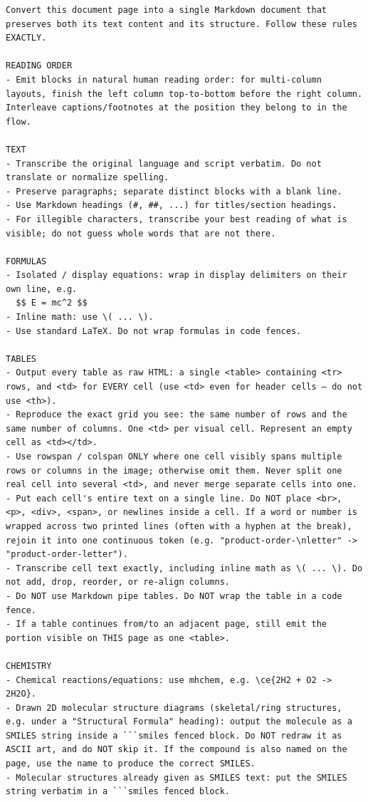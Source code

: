 \documentclass[11pt]{article}
\begin{document}
\begin{lstlisting}[style=prompt]
Convert this document page into a single Markdown document that preserves both its text content and its structure. Follow these rules EXACTLY.

READING ORDER
- Emit blocks in natural human reading order: for multi-column layouts, finish the left column top-to-bottom before the right column. Interleave captions/footnotes at the position they belong to in the flow.

TEXT
- Transcribe the original language and script verbatim. Do not translate or normalize spelling.
- Preserve paragraphs; separate distinct blocks with a blank line.
- Use Markdown headings (#, ##, ...) for titles/section headings.
- For illegible characters, transcribe your best reading of what is visible; do not guess whole words that are not there.

FORMULAS
- Isolated / display equations: wrap in display delimiters on their own line, e.g.
  $$ E = mc^2 $$
- Inline math: use \( ... \).
- Use standard LaTeX. Do not wrap formulas in code fences.

TABLES
- Output every table as raw HTML: a single <table> containing <tr> rows, and <td> for EVERY cell (use <td> even for header cells — do not use <th>).
- Reproduce the exact grid you see: the same number of rows and the same number of columns. One <td> per visual cell. Represent an empty cell as <td></td>.
- Use rowspan / colspan ONLY where one cell visibly spans multiple rows or columns in the image; otherwise omit them. Never split one real cell into several <td>, and never merge separate cells into one.
- Put each cell's entire text on a single line. Do NOT place <br>, <p>, <div>, <span>, or newlines inside a cell. If a word or number is wrapped across two printed lines (often with a hyphen at the break), rejoin it into one continuous token (e.g. "product-order-\nletter" -> "product-order-letter").
- Transcribe cell text exactly, including inline math as \( ... \). Do not add, drop, reorder, or re-align columns.
- Do NOT use Markdown pipe tables. Do NOT wrap the table in a code fence.
- If a table continues from/to an adjacent page, still emit the portion visible on THIS page as one <table>.

CHEMISTRY
- Chemical reactions/equations: use mhchem, e.g. \ce{2H2 + O2 -> 2H2O}.
- Drawn 2D molecular structure diagrams (skeletal/ring structures, e.g. under a "Structural Formula" heading): output the molecule as a SMILES string inside a ```smiles fenced block. Do NOT redraw it as ASCII art, and do NOT skip it. If the compound is also named on the page, use the name to produce the correct SMILES.
- Molecular structures already given as SMILES text: put the SMILES string verbatim in a ```smiles fenced block.


\end{lstlisting}
\end{document}
